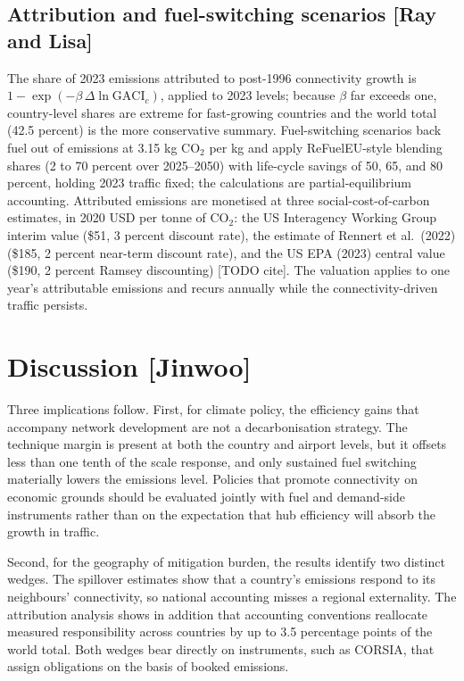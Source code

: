 \documentclass[12pt]{article}
\begin{document}
\subsection*{Attribution and fuel-switching scenarios [Ray and Lisa]}
The share of 2023 emissions attributed to post-1996 connectivity growth is
$1 - \exp(-\beta\,\Delta \ln \mathrm{GACI}_c)$, applied to 2023 levels;
because $\beta$ far exceeds one, country-level shares are extreme for
fast-growing countries and the world total (42.5 percent) is the more
conservative summary. Fuel-switching scenarios back fuel out of emissions
at 3.15 kg CO$_2$ per kg and apply ReFuelEU-style blending shares (2 to 70
percent over 2025--2050) with life-cycle savings of 50, 65, and 80 percent,
holding 2023 traffic fixed; the calculations are partial-equilibrium
accounting. Attributed emissions are monetised at three
social-cost-of-carbon estimates, in 2020 USD per tonne of CO$_2$: the US
Interagency Working Group interim value (\$51, 3 percent discount rate),
the estimate of Rennert et al.\ (2022) (\$185, 2 percent near-term
discount rate), and the US EPA (2023) central value (\$190, 2 percent
Ramsey discounting) [TODO cite]. The valuation applies to one year's
attributable emissions and recurs annually while the connectivity-driven
traffic persists.

\section*{Discussion [Jinwoo]}
Three implications follow. First, for climate policy, the efficiency gains
that accompany network development are not a decarbonisation strategy. The
technique margin is present at both the country and airport levels, but it
offsets less than one tenth of the scale response, and only sustained fuel
switching materially lowers the emissions level. Policies that promote
connectivity on economic grounds should be evaluated jointly with fuel and
demand-side instruments rather than on the expectation that hub efficiency
will absorb the growth in traffic.

Second, for the geography of mitigation burden, the results identify two
distinct wedges. The spillover estimates show that a country's emissions
respond to its neighbours' connectivity, so national accounting misses a
regional externality. The attribution analysis shows in addition that
accounting conventions reallocate measured responsibility across countries
by up to 3.5 percentage points of the world total. Both wedges bear
directly on instruments, such as CORSIA, that assign obligations on the
basis of booked emissions.
\end{document}
